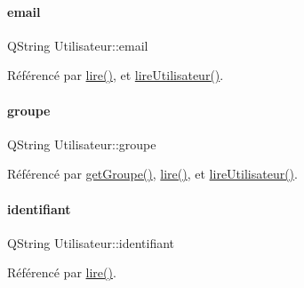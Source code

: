 \paragraph{\texorpdfstring{email}{email}}
{\footnotesize\ttfamily Q\+String Utilisateur\+::email\hspace{0.3cm}{\ttfamily [private]}}



Référencé par \hyperlink{class_utilisateur_aa7d1a92ff4e06e9d302369f6c48884e1}{lire()}, et \hyperlink{class_utilisateur_a5911f84daf6d47d7f50e6d16022b292e}{lire\+Utilisateur()}.

\mbox{\label{class_utilisateur_af795d9518a4eebe00c5b24937732ab2b}} 
\paragraph{\texorpdfstring{groupe}{groupe}}
{\footnotesize\ttfamily Q\+String Utilisateur\+::groupe\hspace{0.3cm}{\ttfamily [private]}}



Référencé par \hyperlink{class_utilisateur_a9922d48c4d295c9357ad8102399322ec}{get\+Groupe()}, \hyperlink{class_utilisateur_aa7d1a92ff4e06e9d302369f6c48884e1}{lire()}, et \hyperlink{class_utilisateur_a5911f84daf6d47d7f50e6d16022b292e}{lire\+Utilisateur()}.

\mbox{\label{class_utilisateur_a1e79e47202a2c716346f47adbbeb2511}} 
\paragraph{\texorpdfstring{identifiant}{identifiant}}
{\footnotesize\ttfamily Q\+String Utilisateur\+::identifiant\hspace{0.3cm}{\ttfamily [private]}}



Référencé par \hyperlink{class_utilisateur_aa7d1a92ff4e06e9d302369f6c48884e1}{lire()}.

\mbox{\label{class_utilisateur_a13c3425772da1d5501e6fe4a2f2b8194}} 
